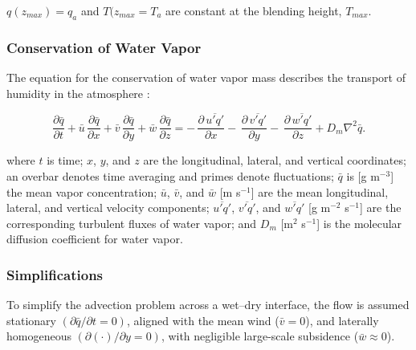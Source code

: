 \documentclass{article}
\begin{document}
    
    $q(z_{max}) = q_a$ and $T(z_{max} = T_a$ are constant at the blending height, $T_{max}$. 
    
    \subsubsection*{Conservation of Water Vapor}
    
    The equation for the conservation of water vapor mass describes the transport of humidity in the atmosphere \cite{brutsaert2013evaporation}: 
    
    
    \begin{equation}
    \frac{\partial \bar{q}}{\partial t}
    + \bar{u}\,\frac{\partial \bar{q}}{\partial x}
    + \bar{v}\,\frac{\partial \bar{q}}{\partial y}
    + \bar{w}\,\frac{\partial \bar{q}}{\partial z}
    =
    -\,\frac{\partial\,\overline{u' q'}}{\partial x}
    -\,\frac{\partial\,\overline{v' q'}}{\partial y}
    -\,\frac{\partial\,\overline{w' q'}}{\partial z}
    + D_m \nabla^2 \bar{q} .
    \label{eq:3.44}
    \end{equation}
    
    \noindent where $t$ is time; $x$, $y$, and $z$ are the longitudinal, lateral, and vertical coordinates; an overbar denotes time averaging and primes denote fluctuations; 
    $\bar{q}$ is [g m$^{-3}$] the mean vapor concentration; 
    $\bar{u}$, $\bar{v}$, and $\bar{w}$ [m s$^{-1}$] are the mean longitudinal, lateral, and vertical velocity components; $\overline{u' q'}$, $\overline{v' q'}$, and $\overline{w' q'}$ [g m$^{-2}$ s$^{-1}$]  are the corresponding turbulent fluxes of water vapor; 
    and $D_m$ [m$^{2}$ s$^{-1}$] is the molecular diffusion coefficient for water vapor.
    
    \subsubsection*{Simplifications}
    
    
    To simplify the advection problem across a wet--dry interface, the flow is assumed stationary
    $\left(\partial \bar q/\partial t = 0\right)$, aligned with the mean wind ($\bar v=0$), and laterally homogeneous
    $\left(\partial(\cdot)/\partial y=0\right)$, with negligible large-scale subsidence ($\bar w \approx 0$).
    
\end{document}
